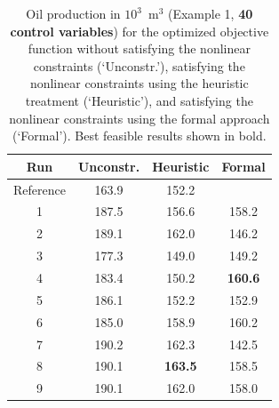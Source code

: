 \begin{table}
\centering
\caption{Oil production in $10^3$~m$^3$ (Example 1, {\bf 40 control variables}) for the optimized objective function
         without satisfying the nonlinear constraints (`Unconstr.'), satisfying the nonlinear constraints
         using the heuristic treatment (`Heuristic'), and satisfying the nonlinear constraints
         using the formal approach (`Formal'). Best feasible results shown in bold.}
\begin{tabular}{|c|c|c|c|}
\hline
   Run & Unconstr. & Heuristic & Formal                       \\
\hline
Reference    & 163.9         &  152.2                      &                           \\
1                     & 187.5         &  156.6                      &        158.2        \\
2                     & 189.1         &  162.0                      &        146.2        \\
3                     & 177.3         &  149.0                      &        149.2        \\
4                     & 183.4         &  150.2                      & \bf{ 160.6 }      \\
5                     & 186.1         &  152.2                      &        152.9        \\
6                     & 185.0         &  158.9                      &        160.2        \\
7                     & 190.2         &  162.3                      &        142.5        \\ 
8                     & 190.1         &\bf{163.5}                 &        158.5        \\
9                     & 190.1         &     162.0                   &        158.0        \\
\hline
\end{tabular}
  \label{table:PiC500Steps8}
\end{table}


   
          
